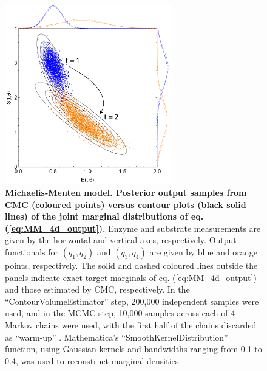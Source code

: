\begin{figure}[H]
  \centerline{\includegraphics[width=0.65\textwidth]{../figures/mm_4d_outputs.pdf}}
  \caption{\textbf{Michaelis-Menten model. Posterior output samples from CMC (coloured points) versus contour plots (black solid lines) of the joint marginal distributions of eq. (\ref{eq:MM_4d_output}).} Enzyme and substrate measurements are given by the horizontal and vertical axes, respectively. Output functionals for $(q_1,q_2)$ and $(q_3,q_4)$ are given by blue and orange points, respectively. The solid and dashed coloured lines outside the panels indicate exact target marginals of eq. (\ref{eq:MM_4d_output}) and those estimated by CMC, respectively. In the ``ContourVolumeEstimator'' step, 200,000 independent samples were used, and in the MCMC step, 10,000 samples across each of 4 Markov chains were used, with the first half of the chains discarded as ``warm-up'' \cite{lambert2018Student}. Mathematica's ``SmoothKernelDistribution'' function, using Gaussian kernels \cite{mathematica} and bandwidths ranging from 0.1 to 0.4, was used to reconstruct marginal densities.}
  \label{fig:mm_4d_outputs}
\end{figure}


